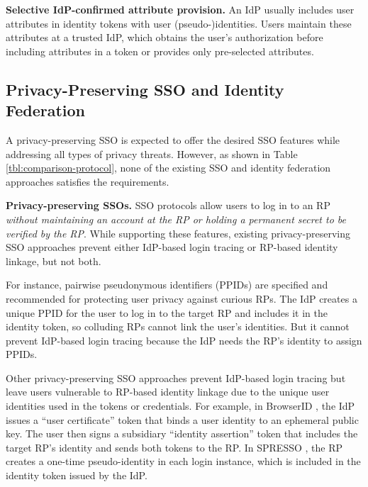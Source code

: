 
\noindent\textbf{Selective IdP-confirmed attribute provision.}
An IdP usually includes user attributes in identity tokens \cite{OpenIDConnect,rfc6749} with user (pseudo-)identities.
Users maintain these attributes at a trusted IdP,
which obtains the user's authorization before including attributes in a token or provides only pre-selected attributes.

\subsection{Privacy-Preserving SSO and Identity Federation}
\label{subsec-solutions}

A privacy-preserving SSO is expected to offer the desired SSO features while addressing all types of privacy threats. However, as shown in 
Table \ref{tbl:comparison-protocol}, none of the existing SSO and identity federation approaches satisfies the requirements.

\noindent\textbf{Privacy-preserving SSOs.} SSO protocols \cite{OpenIDConnect,rfc6749, SAML, SAMLIdentifier} allow users to log in to an RP \emph{without maintaining an account at the RP or holding a permanent secret to be verified by the RP}. While supporting these features, existing privacy-preserving SSO approaches \cite{BrowserID, SPRESSO, NIST2017draft} prevent either IdP-based login tracing or RP-based identity linkage, but not both. %

For instance, pairwise pseudonymous identifiers (PPIDs) are specified \cite{OpenIDConnect, SAMLIdentifier} and recommended \cite{NIST2017draft}
for protecting user privacy against curious RPs. The IdP creates a unique PPID for the user to log in to the target RP and includes it in the identity token, so colluding RPs cannot link the user's identities. But it cannot prevent IdP-based login tracing because the IdP needs the RP's identity to assign PPIDs.

Other privacy-preserving SSO approaches prevent IdP-based login tracing but leave users vulnerable to RP-based identity linkage due to the unique user identities used in the tokens or credentials. For example, in BrowserID \cite{BrowserID}, %
the IdP %
issues a ``user certificate'' token that binds a user identity to an ephemeral public key. The user then signs a subsidiary ``identity assertion'' token that includes the target RP's identity and sends both tokens to the RP.
In SPRESSO \cite{SPRESSO}, the RP creates a one-time pseudo-identity in each login instance, which is included in the identity token issued by the IdP. %

